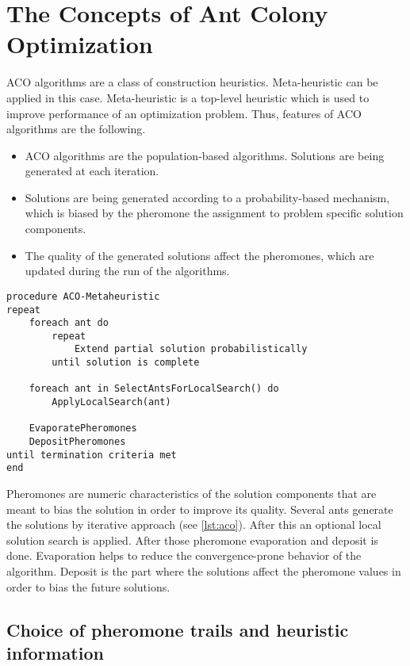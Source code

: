 \section{The Concepts of Ant Colony Optimization}

ACO algorithms are a class of construction heuristics. Meta-heuristic can be applied in this case. Meta-heuristic is a top-level heuristic which is used to improve performance of an optimization problem. Thus, features of ACO algorithms are the following.

\begin{itemize}
\item ACO algorithms are the population-based algorithms. Solutions are being generated at each iteration.
\item Solutions are being generated according to a probability-based mechanism, which is biased by the pheromone the assignment to problem specific solution components.
\item The quality of the generated solutions affect the pheromones, which are updated during the run of the algorithms.
\end{itemize}


\begin{minipage}[c, breaklines=true]{0.95\textwidth}
\begin{lstlisting}[caption={General ACO pseudo-code}, label={lst:aco}]
procedure ACO-Metaheuristic
repeat
	foreach ant do
		repeat
			Extend partial solution probabilistically
		until solution is complete
	
	foreach ant in SelectAntsForLocalSearch() do
		ApplyLocalSearch(ant)
	
	EvaporatePheromones
	DepositPheromones
until termination criteria met
end
\end{lstlisting}
\end{minipage}

Pheromones are numeric characteristics of the solution components that are meant to bias the solution in order to improve its quality. Several ants generate the solutions by iterative approach (see \ref{lst:aco}). After this an optional local solution search is applied. After those pheromone evaporation and deposit is done. Evaporation helps to reduce the convergence-prone behavior of the algorithm. Deposit is the part where the solutions affect the pheromone values in order to bias the future solutions.

\subsection{Choice of pheromone trails and heuristic information}

